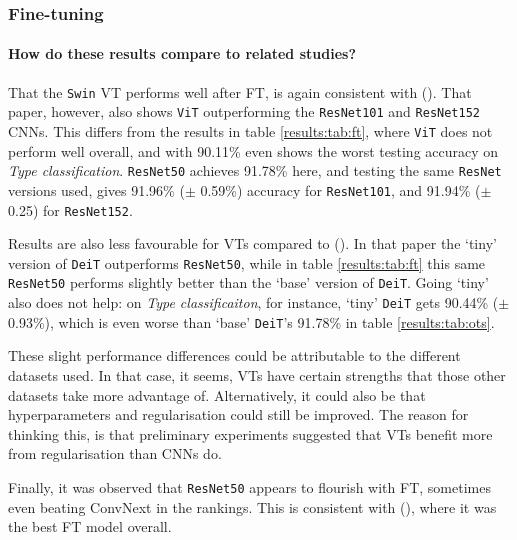 \subsubsection{Fine-tuning}

\paragraph{How do these results compare to related studies?}
That the \texttt{Swin} VT performs well after FT, is again consistent with \citeauthor{zhou2021convnets} (\citeyear{zhou2021convnets}). That paper, however, also shows \texttt{ViT} outperforming the \texttt{ResNet101} and \texttt{ResNet152} CNNs. This differs from the results in table \ref{results:tab:ft}, where \texttt{ViT} does not perform well overall, and with 90.11\% even shows the worst testing accuracy on \textit{Type classification}. \texttt{ResNet50} achieves 91.78\% here, and testing the same \texttt{ResNet} versions \citeauthor{zhou2021convnets} used, gives 91.96\% ($\pm$ 0.59\%) accuracy for \texttt{ResNet101}, and 91.94\% ($\pm$ 0.25) for \texttt{ResNet152}.

Results are also less favourable for VTs compared to \citeauthor{matsoukas2021time} (\citeyear{matsoukas2021time}). In that paper the `tiny' version of \texttt{DeiT} outperforms \texttt{ResNet50}, while in table \ref{results:tab:ft} this same \texttt{ResNet50} performs slightly better than the `base' version of \texttt{DeiT}. Going `tiny' also does not help: on \textit{Type classificaiton}, for instance, `tiny' \texttt{DeiT} gets 90.44\% ($\pm$ 0.93\%), which is even worse than `base' \texttt{DeiT}'s 91.78\% in table \ref{results:tab:ots}.

These slight performance differences could be attributable to the different datasets used. In that case, it seems, VTs have certain strengths that those other datasets take more advantage of. Alternatively, it could also be that hyperparameters and regularisation could still be improved. The reason for thinking this, is that preliminary experiments suggested that VTs benefit more from regularisation than CNNs do.

Finally, it was observed that \texttt{ResNet50} appears to flourish with FT, sometimes even beating Conv\-Next in the rankings. This is consistent with \citeauthor{sabatelli2018deep} (\citeyear{sabatelli2018deep}), where it was the best FT model overall.


